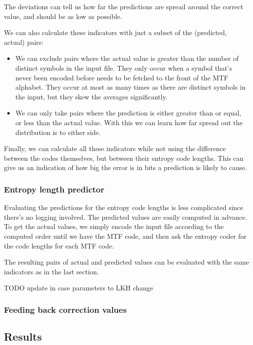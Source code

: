 \documentclass[a4paper]{scrreprt}
\begin{document}
The deviations can tell us how far the predictions are spread around the correct
value, and should be as low as possible.

We can also calculate these indicators with just a subset of the
(predicted, actual) pairs:
\begin{itemize}
  \item We can exclude pairs where the actual value is
  greater than the number of distinct symbols in the input file. They only occur
  when a symbol that's never been encoded before needs to be fetched to the
  front of the MTF alphabet. They occur at most as many times as there are
  distinct symbols in the input, but they skew the averages significantly.
  \item We can only take pairs where the prediction is either greater than or
  equal, or less than the actual value. With this we can learn how far spread
  out the distribution is to either side.
\end{itemize}

Finally, we can calculate all these indicators while not using the difference
between the codes themselves, but between their entropy code lengths. This can
give us an indication of how big the error is in bits a prediction is likely to
cause.

\subsubsection{Entropy length predictor}

Evaluating the predictions for the entropy code lengths is less complicated
since there's no logging involved. The predicted values are easily computed in
advance. To get the actual values, we simply encode the input file according to
the computed order until we have the MTF code, and then ask the entropy coder
for the code lengths for each MTF code.

The resulting pairs of actual and predicted values can be evaluated with the
same indicators as in the last section.


TODO update in case parameters to LKH change
\subsubsection{Feeding back correction values}

\subsection{Results}
\end{document}
